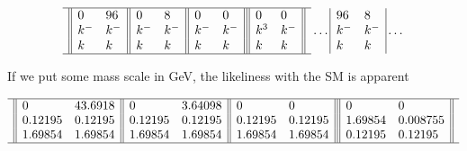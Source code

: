 \documentclass{article}
\begin{document}
$$
\begin{array}{c}
\hline
\begin{array}{||ll||}
 0     & 96\\
 k^-     & k^-\\
 k  &k 
\end{array} 
\begin{array}{ll}
 0     & 8\\
 k^-     & k^-\\
 k  &k 
\end{array} 
\begin{array}{||ll}
 0      & 0        \\
 k^{-} & k^{-} \\
 k      & k          
\end{array}
\begin{array}{|||ll||}
 0   &    0    \\
 k^3 & k^{-} \\ 
 k   &   k     
\end{array} \\
\hline
\end{array}
\dots
\begin{array}{|ll|}
 96     & 8\\
 k^-     & k^-\\
 k  &k 
\end{array} 
\dots
$$



If we put some mass scale in GeV, the likeliness with the SM is apparent

$$
\begin{array}{c}
\hline
\begin{array}{||ll||}
 0  & 43.6918 \\ 
 0.12195 & 0.12195 \\
1.69854 & 1.69854
\end{array} 
\begin{array}{ll}
 0     & 3.64098 \\
 0.12195 & 0.12195 \\
 1.69854 & 1.69854
\end{array} 
\begin{array}{||ll}
 0      & 0        \\
 0.12195 & 0.12195 \\
 1.69854 & 1.69854 \\
\end{array}
\begin{array}{|||ll||}
 0   &    0    \\
 1.69854  & 0.008755 \\
 0.12195 & 0.12195
\end{array} \\
\hline
\end{array}
$$
\end{document}
